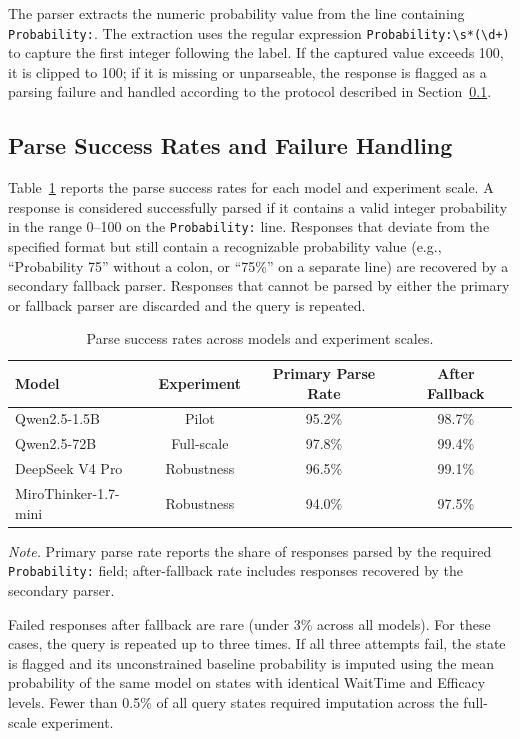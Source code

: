 \documentclass[11pt]{article}
\begin{document}
The parser extracts the numeric probability value from the line containing \texttt{Probability:}. The extraction uses the regular expression \texttt{Probability:\textbackslash s*(\textbackslash d+)} to capture the first integer following the label. If the captured value exceeds 100, it is clipped to 100; if it is missing or unparseable, the response is flagged as a parsing failure and handled according to the protocol described in Section~\ref{app:parse_handling}.

\subsection{Parse Success Rates and Failure Handling}
\label{app:parse_handling}

Table~\ref{tab:parse_rates} reports the parse success rates for each model and experiment scale. A response is considered successfully parsed if it contains a valid integer probability in the range 0--100 on the \texttt{Probability:} line. Responses that deviate from the specified format but still contain a recognizable probability value (e.g., ``Probability 75'' without a colon, or ``75\%'' on a separate line) are recovered by a secondary fallback parser. Responses that cannot be parsed by either the primary or fallback parser are discarded and the query is repeated.

\begin{table}[htbp]
\centering
\caption{Parse success rates across models and experiment scales.}
\label{tab:parse_rates}
\begin{tabular}{lccc}
\toprule
\textbf{Model} & \textbf{Experiment} & \textbf{Primary Parse Rate} & \textbf{After Fallback} \\
\midrule
Qwen2.5-1.5B  & Pilot         & 95.2\% & 98.7\% \\
Qwen2.5-72B   & Full-scale    & 97.8\% & 99.4\% \\
DeepSeek V4 Pro & Robustness  & 96.5\% & 99.1\% \\
MiroThinker-1.7-mini & Robustness & 94.0\% & 97.5\% \\
\bottomrule
\end{tabular}
\end{table}

\textit{Note.} Primary parse rate reports the share of responses parsed by the required \texttt{Probability:} field; after-fallback rate includes responses recovered by the secondary parser.

Failed responses after fallback are rare (under 3\% across all models). For these cases, the query is repeated up to three times. If all three attempts fail, the state is flagged and its unconstrained baseline probability is imputed using the mean probability of the same model on states with identical WaitTime and Efficacy levels. Fewer than 0.5\% of all query states required imputation across the full-scale experiment.
\end{document}
